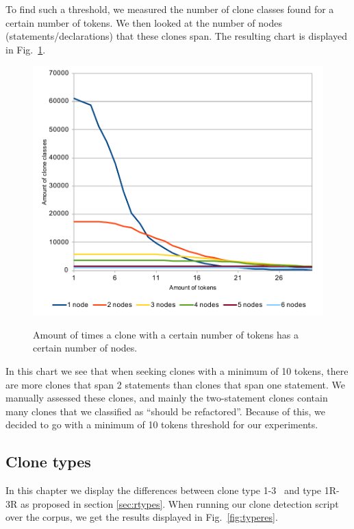 \documentclass[a4paper]{article}
\begin{document}
To find such a threshold, we measured the number of clone classes found for a certain number of tokens. We then looked at the number of nodes (statements/declarations) that these clones span. The resulting chart is displayed in Fig.~\ref{fig:tokenthreshold}.

\begin{figure}[H]
  \caption{Amount of times a clone with a certain number of tokens has a certain number of nodes.}
    \includegraphics[width=.95\columnwidth]{img/TokenThreshold}
  \label{fig:tokenthreshold}
\end{figure}

In this chart we see that when seeking clones with a minimum of 10 tokens, there are more clones that span 2 statements than clones that span one statement. We manually assessed these clones, and mainly the two-statement clones contain many clones that we classified as ``should be refactored''. Because of this, we decided to go with a minimum of 10 tokens threshold for our experiments.

\subsection{Clone types}\label{sec:clonetypeexperiments}
In this chapter we display the differences between clone type 1-3~\cite{roy2007survey} and type 1R-3R as proposed in section \ref{sec:rtypes}. When running our clone detection script over the corpus, we get the results displayed in Fig.~\ref{fig:typeres}.
\end{document}
